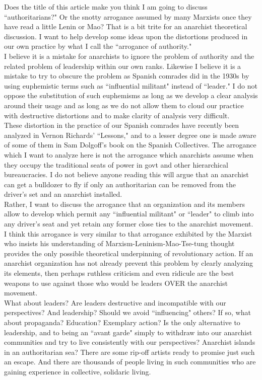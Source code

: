 \documentclass[12pt, onecolumn, letterpaper, oneside]{book}
\begin{document}
Does the title of this article make you think I am going to discuss ``authoritarians?" Or the snotty arrogance assumed by many Marxists once they have read a little Lenin or Mao? That is a bit trite for an anarchist theoretical discussion. I want to help develop some ideas upon the distortions produced in our own practice by what I call the ``arrogance of authority."\\
I believe it is a mistake for anarchists to ignore the problem of authority and the related problem of leadership within our own ranks. Likewise I believe it is a mistake to try to obscure the problem as Spanish comrades did in the 1930s by using euphemistic terms such as ``influential militant" instead of ``leader." I do not oppose the substitution of such euphemisms as long as we develop a clear analysis around their usage and as long as we do not allow them to cloud our practice with destructive distortions and to make clarity of analysis very difficult.\\
These distortion in the practice of our Spanish comrades have recently been analyzed in Vernon Richards' ``Lessons," and to a lesser degree one is made aware of some of them in Sam Dolgoff's book on the Spanish Collectives. The arrogance which I want to analyze here is not the arrogance which anarchists assume when they occupy the traditional seats of power in govt and other hierarchical bureaucracies. I do not believe anyone reading this will argue that an anarchist can get a bulldozer to fly if only an authoritarian can be removed from the driver's set and an anarchist installed.\\
Rather, I want to discuss the arrogance that an organization and its members allow to develop which permit any ``influential militant" or ``leader" to climb into any driver's seat and yet retain any former close ties to the anarchist movement. I think this arrogance is very similar to that arrogance exhibited by the Marxist who insists his understanding of Marxism-Leninism-Mao-Tse-tung thought provides the only possible theoretical underpinning of revolutionary action. If an anarchist organization has not already prevent this problem by clearly analyzing its elements, then perhaps ruthless criticism and even ridicule are the best weapons to use against those who would be leaders OVER the anarchist movement.\\
What about leaders? Are leaders destructive and incompatible with our perspectives? And leadership? Should we avoid ``influencing" others? If so, what about propaganda? Education? Exemplary action? Is the only alternative to leadership, and to being an ``avant garde" simply to withdraw into our anarchist communities and try to live consistently with our perspectives? Anarchist islands in an authoritarian sea? There are some rip-off artists ready to promise just such an escape. And there are thousands of people living in such communities who are gaining experience in collective, solidaric living.\\
\end{document}

